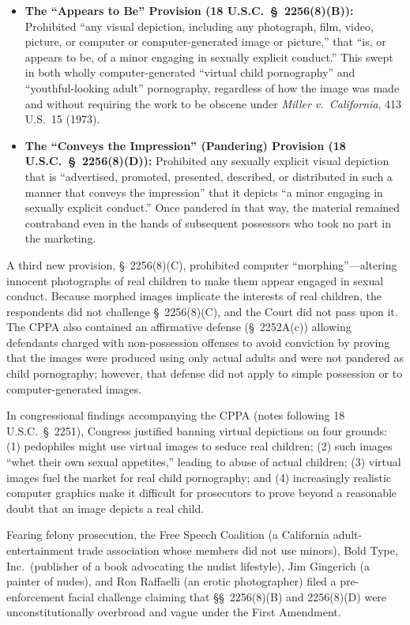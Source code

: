 \documentclass[12pt]{article}
\begin{document}
\begin{itemize}
\item \textbf{The ``Appears to Be'' Provision (18 U.S.C.\ \S~2256(8)(B)):} Prohibited ``any visual depiction, including any photograph, film, video, picture, or computer or computer-generated image or picture,'' that ``is, or appears to be, of a minor engaging in sexually explicit conduct.'' This swept in both wholly computer-generated ``virtual child pornography'' and ``youthful-looking adult'' pornography, regardless of how the image was made and without requiring the work to be obscene under \textit{Miller v.\ California}, 413 U.S.\ 15 (1973).
\item \textbf{The ``Conveys the Impression'' (Pandering) Provision (18 U.S.C.\ \S~2256(8)(D)):} Prohibited any sexually explicit visual depiction that is ``advertised, promoted, presented, described, or distributed in such a manner that conveys the impression'' that it depicts ``a minor engaging in sexually explicit conduct.'' Once pandered in that way, the material remained contraband even in the hands of subsequent possessors who took no part in the marketing.
\end{itemize}

A third new provision, \S~2256(8)(C), prohibited computer ``morphing''---altering innocent photographs of real children to make them appear engaged in sexual conduct. Because morphed images implicate the interests of real children, the respondents did not challenge \S~2256(8)(C), and the Court did not pass upon it. The CPPA also contained an affirmative defense (\S~2252A(c)) allowing defendants charged with non-possession offenses to avoid conviction by proving that the images were produced using only actual adults and were not pandered as child pornography; however, that defense did not apply to simple possession or to computer-generated images.

In congressional findings accompanying the CPPA (notes following 18 U.S.C.\ \S~2251), Congress justified banning virtual depictions on four grounds: (1) pedophiles might use virtual images to seduce real children; (2) such images ``whet their own sexual appetites,'' leading to abuse of actual children; (3) virtual images fuel the market for real child pornography; and (4) increasingly realistic computer graphics make it difficult for prosecutors to prove beyond a reasonable doubt that an image depicts a real child.

Fearing felony prosecution, the Free Speech Coalition (a California adult-entertainment trade association whose members did not use minors), Bold Type, Inc.\ (publisher of a book advocating the nudist lifestyle), Jim Gingerich (a painter of nudes), and Ron Raffaelli (an erotic photographer) filed a pre-enforcement facial challenge claiming that \S\S~2256(8)(B) and 2256(8)(D) were unconstitutionally overbroad and vague under the First Amendment.
\end{document}
